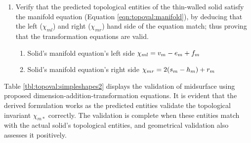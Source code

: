 \begin{enumerate}
\begin{enumerate}
	\end{enumerate}
\item Verify that the predicted topological entities of the  thin-walled solid satisfy the manifold equation (Equation \ref{eqn:topoval:manifold}), by deducing that the left ($\chi_{ml}$) and right  ($\chi_{mr}$) hand side of the equation match; thus proving that the transformation equations are valid. 
	\begin{enumerate}
		\item Solid's manifold equation's left side  $\chi_{ml} \newline= v_m-e_m+f_m $
		\item Solid's manifold equation's right side  $\chi_{mr}\newline=2(s_m-h_m )+r_m$
	\end{enumerate}
\end{enumerate}




Table \ref{tbl:topoval:simpleshapes2} displays the validation of midsurface using proposed dimension-addition-transformation equations. It is evident that the derived formulation works as the predicted entities validate the topological invariant $\chi_{m*}$ correctly. The validation is complete when these entities match with the actual solid's topological entities, and geometrical validation also assesses it positively.


